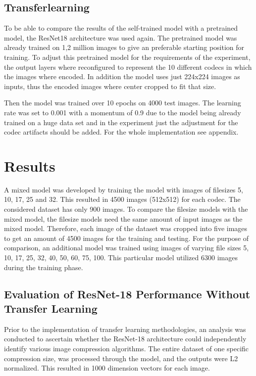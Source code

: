 \subsection{Transferlearning}
To be able to compare the results of the self-trained model with a pretrained model, the ResNet18 architecture was used again. The pretrained model was already trained on 1,2 million images to give an preferable starting position for training. To adjust this pretrained model for the requirements of the experiment, the output layers where reconfigured to represent the 10 different codecs in which the images where encoded.
In addition the model uses just 224x224 images as inputs, thus the encoded images where center cropped to fit that size.



\noindent
Then the model was trained over 10 epochs on 4000 test images. The learning rate was set to 0.001 with a momentum of 0.9 due to the model being already trained on a huge data set and in the experiment just the adjustment for the codec artifacts should be added. For the whole implementation see appendix.

\section{Results}
\label{Results}
A mixed model was developed by training the model with images of filesizes 5, 10, 17, 25 and 32. This resulted in 4500 images (512x512) for each codec. The considered dataset has only 900 images. To compare the filesize models with the mixed model, the filesize models need the same amount of input images as the mixed model. Therefore, each image of the dataset was cropped into five images to get an amount of 4500 images for the training and testing.
For the purpose of comparison, an additional model was trained using images of varying file sizes 5, 10, 17, 25, 32, 40, 50, 60, 75, 100. This particular model utilized 6300 images during the training phase.

\subsection{Evaluation of ResNet-18 Performance Without Transfer Learning}
Prior to the implementation of transfer learning methodologies, an analysis was conducted to ascertain whether the ResNet-18 architecture could independently identify various image compression algorithms. The entire dataset of one specific compression size, was processed through the model, and the outputs were L2 normalized. This resulted in 1000 dimension vectors for each image.

